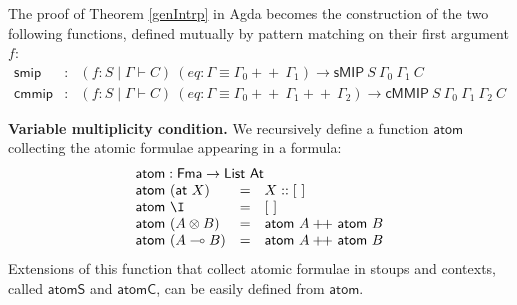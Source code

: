 \documentclass[sn-mathphys-num]{sn-jnl}%
\newcommand{\ot}{\otimes}
\newcommand{\lolli}{\multimap}
\newcommand{\sMIP}{\textsf{sMIP}}
\newcommand{\cMMIP}{\textsf{cMMIP}}
\newcommand{\List}{\mathsf{List}}
\newcommand{\append}{+\!\!+}
\newcommand{\At}{\mathsf{At}}
\newcommand{\Fma}{\mathsf{Fma}}
\theoremstyle{thmstyleone}%
\theoremstyle{thmstyletwo}%
\theoremstyle{thmstylethree}%
\begin{document}
The proof of Theorem \ref{genIntrp} in Agda becomes the construction of the two following functions, defined mutually by pattern matching on their first argument $f$:
\[
\begin{array}{rcl}
\mathsf{smip} & : & (f : S \mid \Gamma \vdash C)
~(eq : \Gamma \equiv \Gamma_0 \append ~\Gamma_1)
\to \sMIP ~S~\Gamma_0~\Gamma_1~C
\\[2pt]
\mathsf{cmmip} & : & (f : S \mid \Gamma \vdash C)
~(eq : \Gamma \equiv \Gamma_0 \append ~\Gamma_1 \append ~\Gamma_2)
\to \cMMIP ~S~\Gamma_0~\Gamma_1~\Gamma_2~C
\end{array}
\]

\noindent\textbf{Variable multiplicity condition.}
We recursively define a function $\mathsf{atom}$ collecting the atomic formulae appearing in a formula:
\[
\begin{array}{lcl}
  \multicolumn{3}{l}{\mathsf{atom} : \Fma \to \List ~\At} \\
  \mathsf{atom} ~(\mathsf{at} ~X) & = & X :: [~] \\
  \mathsf{atom} ~\I &=& [~] \\
  \mathsf{atom} ~(A \ot B) &=& \mathsf{atom} ~A \append~ \mathsf{atom} ~B \\
  \mathsf{atom} ~(A \lolli B) &=& \mathsf{atom} ~A \append~ \mathsf{atom} ~B
\end{array}
\]
Extensions of this function that collect atomic formulae in stoups and contexts, called $\mathsf{atomS}$ and $\mathsf{atomC}$, can be easily defined from $\mathsf{atom}$.
\end{document}
